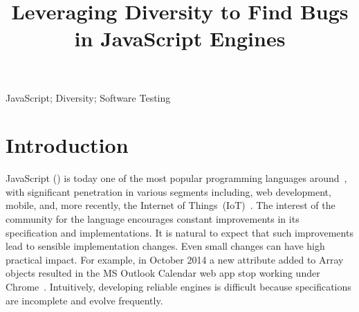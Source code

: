 \documentclass[10pt,conference,anonymous]{IEEEtran}
\begin{document}
\title{Leveraging Diversity to Find Bugs\\ in JavaScript Engines}


\maketitle

\thispagestyle{plain}
\pagestyle{plain}

\begin{abstract}
  
\end{abstract}

\begin{IEEEkeywords}
JavaScript; Diversity; Software Testing
\end{IEEEkeywords}

\section{Introduction}

JavaScript (\js{}) is today one of the most popular programming
languages around~\cite{business-insider,stackify}, with significant
penetration in various segments including, web development, mobile,
and, more recently, the Internet of
Things~(IoT)~\cite{simply-technologies}. The interest of the community
for the language encourages constant improvements in its specification
and implementations. It is natural to expect that such improvements
lead to sensible implementation changes. Even small changes can have
high practical impact. For example, in October 2014 a new attribute
added to Array objects resulted in the MS Outlook Calendar web app
stop working under
Chrome~\cite{array-bug-chromium-issue4247,array-bug-discussion}.
Intuitively, developing reliable engines is difficult because
specifications are incomplete and evolve frequently.
\end{document}
